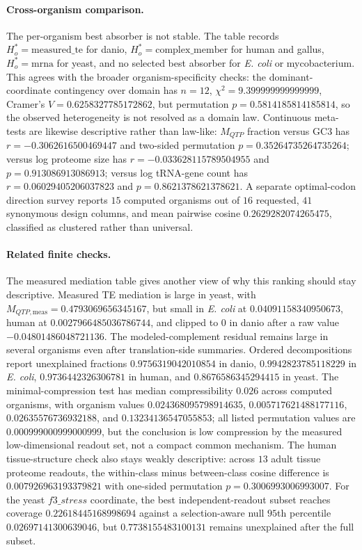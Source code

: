 \paragraph{Cross-organism comparison.}
The per-organism best absorber is not stable.  The table records $H_o^\ast=\mathrm{measured\_te}$ for danio, $H_o^\ast=\mathrm{complex\_member}$ for human and gallus, $H_o^\ast=\mathrm{mrna}$ for yeast, and no selected best absorber for \emph{E. coli} or mycobacterium.  This agrees with the broader organism-specificity checks: the dominant-coordinate contingency over domain has $n=12$, $\chi^2=9.399999999999999$, Cramer's $V=0.6258327785172862$, but permutation $p=0.5814185814185814$, so the observed heterogeneity is not resolved as a domain law.  Continuous meta-tests are likewise descriptive rather than law-like: $M_{QTP}$ fraction versus GC3 has $r=-0.3062616500469447$ and two-sided permutation $p=0.35264735264735264$; versus log proteome size has $r=-0.033628115789504955$ and $p=0.913086913086913$; versus log tRNA-gene count has $r=0.06029405206037823$ and $p=0.8621378621378621$.  A separate optimal-codon direction survey reports $15$ computed organisms out of $16$ requested, $41$ synonymous design columns, and mean pairwise cosine $0.2629282074265475$, classified as clustered rather than universal.

\paragraph{Related finite checks.}
The measured mediation table gives another view of why this ranking should stay descriptive.  Measured TE mediation is large in yeast, with $M_{QTP,\mathrm{meas}}=0.4793069656345167$, but small in \emph{E. coli} at $0.04091158340950673$, human at $0.0027966485036786744$, and clipped to $0$ in danio after a raw value $-0.04801486048721136$.  The modeled-complement residual remains large in several organisms even after translation-side summaries.  Ordered decompositions report unexplained fractions $0.9756319042010854$ in danio, $0.9942823785118229$ in \emph{E. coli}, $0.9736442326306781$ in human, and $0.8676586345294415$ in yeast.  The minimal-compression test has median compressibility $0.026$ across computed organisms, with organism values $0.024368095798914635$, $0.005717621488177116$, $0.02635576736932188$, and $0.13234136547055853$; all listed permutation values are $0.000999000999000999$, but the conclusion is low compression by the measured low-dimensional readout set, not a compact common mechanism.  The human tissue-structure check also stays weakly descriptive: across $13$ adult tissue proteome readouts, the within-class minus between-class cosine difference is $0.007926963193379821$ with one-sided permutation $p=0.3006993006993007$.  For the yeast $f3\_stress$ coordinate, the best independent-readout subset reaches coverage $0.22618445168998694$ against a selection-aware null $95$th percentile $0.02697141300639046$, but $0.7738155483100131$ remains unexplained after the full subset.

